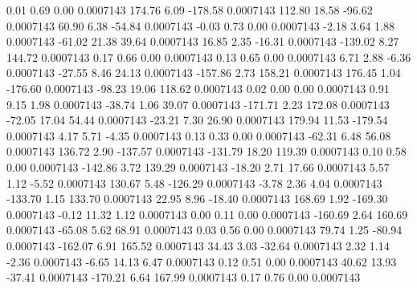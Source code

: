         0.01        0.69        0.00     0.0007143
      174.76        6.09     -178.58     0.0007143
      112.80       18.58      -96.62     0.0007143
       60.90        6.38      -54.84     0.0007143
       -0.03        0.73        0.00     0.0007143
       -2.18        3.64        1.88     0.0007143
      -61.02       21.38       39.64     0.0007143
       16.85        2.35      -16.31     0.0007143
     -139.02        8.27      144.72     0.0007143
        0.17        0.66        0.00     0.0007143
        0.13        0.65        0.00     0.0007143
        6.71        2.88       -6.36     0.0007143
      -27.55        8.46       24.13     0.0007143
     -157.86        2.73      158.21     0.0007143
      176.45        1.04     -176.60     0.0007143
      -98.23       19.06      118.62     0.0007143
        0.02        0.00        0.00     0.0007143
        0.91        9.15        1.98     0.0007143
      -38.74        1.06       39.07     0.0007143
     -171.71        2.23      172.08     0.0007143
      -72.05       17.04       54.44     0.0007143
      -23.21        7.30       26.90     0.0007143
      179.94       11.53     -179.54     0.0007143
        4.17        5.71       -4.35     0.0007143
        0.13        0.33        0.00     0.0007143
      -62.31        6.48       56.08     0.0007143
      136.72        2.90     -137.57     0.0007143
     -131.79       18.20      119.39     0.0007143
        0.10        0.58        0.00     0.0007143
     -142.86        3.72      139.29     0.0007143
      -18.20        2.71       17.66     0.0007143
        5.57        1.12       -5.52     0.0007143
      130.67        5.48     -126.29     0.0007143
       -3.78        2.36        4.04     0.0007143
     -133.70        1.15      133.70     0.0007143
       22.95        8.96      -18.40     0.0007143
      168.69        1.92     -169.30     0.0007143
       -0.12       11.32        1.12     0.0007143
        0.00        0.11        0.00     0.0007143
     -160.69        2.64      160.69     0.0007143
      -65.08        5.62       68.91     0.0007143
        0.03        0.56        0.00     0.0007143
       79.74        1.25      -80.94     0.0007143
     -162.07        6.91      165.52     0.0007143
       34.43        3.03      -32.64     0.0007143
        2.32        1.14       -2.36     0.0007143
       -6.65       14.13        6.47     0.0007143
        0.12        0.51        0.00     0.0007143
       40.62       13.93      -37.41     0.0007143
     -170.21        6.64      167.99     0.0007143
        0.17        0.76        0.00     0.0007143
